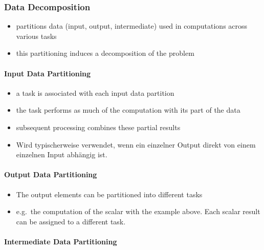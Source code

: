 \hypertarget{data-decomposition}{%
\subsubsection{Data Decomposition}\label{data-decomposition}}

\begin{itemize}
\tightlist
\item
  partitions data (input, output, intermediate) used in computations
  across various tasks
\item
  this partitioning induces a decomposition of the problem
\end{itemize}

\hypertarget{input-data-partitioning}{%
\paragraph{Input Data Partitioning}\label{input-data-partitioning}}

\begin{itemize}
\tightlist
\item
  a task is associated with each input data partition
\item
  the task performs as much of the computation with its part of the data
\item
  subsequent processing combines these partial results
\item
  Wird typischerweise verwendet, wenn ein einzelner Output direkt von
  einem einzelnen Input abhängig ist.
\end{itemize}

\hypertarget{output-data-partitioning}{%
\paragraph{Output Data Partitioning}\label{output-data-partitioning}}

\begin{itemize}
\tightlist
\item
  The output elements can be partitioned into different tasks
\item
  e.g.~the computation of the scalar with the example above. Each scalar
  result can be assigned to a different task.
\end{itemize}

\hypertarget{intermediate-data-partitioning}{%
\paragraph{Intermediate Data
Partitioning}\label{intermediate-data-partitioning}}

